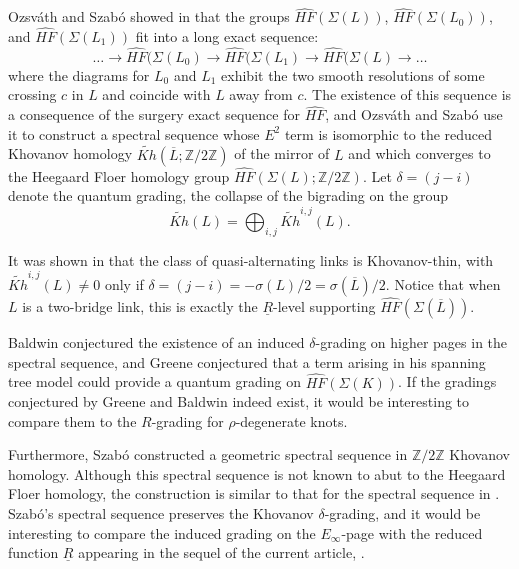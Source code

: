 \documentclass[11pt]{article}
\theoremstyle{plain} \newtheorem{thm}{Theorem}[subsection]
\theoremstyle{plain} \newtheorem{cor}[thm]{Corollary}
\theoremstyle{plain} \newtheorem{prop}[thm]{Proposition}
\theoremstyle{plain} \newtheorem{conj}[thm]{Conjecture}
\theoremstyle{plain} \newtheorem{lem}[thm]{Lemma}
\theoremstyle{definition} \newtheorem{df}[thm]{Definition}
\theoremstyle{remark} \newtheorem{rmk}[thm]{Remark}
\theoremstyle{remark} \newtheorem{obs}[thm]{Observation}
\newcommand{\DBC}[1]{\Sigma(#1)}
\newcommand{\tld}[1]{\widetilde{#1}}
\newcommand{\red}[1]{\underline{#1}}
\newcommand{\HF}[1]{\widehat{HF}\left(\DBC{K}\right)}
\newcommand{\Zcaltwo}{\mathbb{Z}/2\mathbb{Z}}
\begin{document}
Ozsv\'ath and Szab\'o showed in \cite{os:bc} that the groups $\widehat{HF}(\DBC{L})$, $\widehat{HF}(\DBC{L_{0}})$, and $\widehat{HF}(\DBC{L_{1}})$ fit into a long exact sequence:
\begin{equation*}\label{eq:skein}
\ldots \longrightarrow \widehat{HF}(\DBC{L_{0}} \longrightarrow \widehat{HF}(\DBC{L_{1}} \longrightarrow \widehat{HF}(\DBC{L} \longrightarrow \ldots
\end{equation*}
where the diagrams for $L_{0}$ and $L_{1}$ exhibit the two smooth resolutions of some crossing $c$ in $L$ and coincide with $L$ away from $c$.  The existence of this sequence is a consequence of the surgery exact sequence for $\widehat{HF}$, and Ozsv\'ath and Szab\'o use it to construct a spectral sequence whose $E^{2}$ term is isomorphic to the reduced Khovanov homology $\tld{Kh}(\overline{L}; \Zcaltwo)$ of the mirror of $L$ and which converges to the Heegaard Floer homology group $\widehat{HF}(\DBC{L};\Zcaltwo)$.  Let  $\delta =(j - i)$ denote the quantum grading, the collapse of the bigrading on the group
\begin{equation*}
\tld{Kh}(L) = \displaystyle\bigoplus_{i,j} \tld{Kh}^{i,j}(L).
\end{equation*}

It was shown in \cite{cmoz:thin} that the class of quasi-alternating links is Khovanov-thin, with $\tld{Kh}^{i,j} (L)\neq 0$ only if $\delta = (j-i) = -\sigma(L)/2 = \sigma(\overline{L})/2$.  Notice that when $L$ is a two-bridge link, this is exactly the $\red{R}$-level supporting $\widehat{HF}(\DBC{\overline{L}}).$

Baldwin \cite{baldwin:ss} conjectured the existence of an induced $\delta$-grading on higher pages in the spectral sequence, and Greene \cite{jg:tree} conjectured that a term arising in his spanning tree model could provide a quantum grading on $\HF{K}$.  If the gradings conjectured by Greene and Baldwin indeed exist, it would be interesting to compare them to the $R$-grading for $\rho$-degenerate knots.

Furthermore, Szab\'o \cite{szabo:kh} constructed a geometric spectral sequence in $\mathbb{Z}/2\mathbb{Z}$ Khovanov homology.  Although this spectral sequence is not known to abut to the Heegaard Floer homology, the construction is similar to that for the spectral sequence in \cite{os:bc}.  Szab\'o's spectral sequence preserves the Khovanov $\delta$-grading, and it would be interesting to compare the induced grading on the $E_{\infty}$-page with the reduced function $\red{R}$ appearing in the sequel of the current article, \cite{et:R2}.
\end{document}
